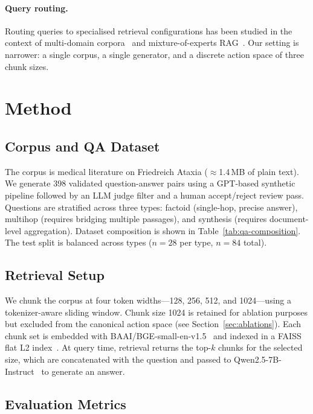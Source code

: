 \documentclass{article}
\begin{document}
\paragraph{Query routing.}
Routing queries to specialised retrieval configurations has been studied in
the context of multi-domain corpora~\cite{asai2023selfrag} and
mixture-of-experts RAG~\cite{shi2024large}. Our setting is narrower: a
single corpus, a single generator, and a discrete action space of three
chunk sizes.

\section{Method}

\subsection{Corpus and QA Dataset}

The corpus is medical literature on Friedreich Ataxia ($\approx$1.4\,MB of
plain text). We generate 398 validated question-answer pairs using a
GPT-based synthetic pipeline followed by an LLM judge filter and a human
accept/reject review pass. Questions are stratified across three types:
factoid (single-hop, precise answer), multihop (requires bridging multiple
passages), and synthesis (requires document-level aggregation). Dataset
composition is shown in Table~\ref{tab:qa-composition}. The test split is
balanced across types ($n=28$ per type, $n=84$ total).



\subsection{Retrieval Setup}

We chunk the corpus at four token widths---128, 256, 512, and 1024---using
a tokenizer-aware sliding window. Chunk size 1024 is retained for ablation
purposes but excluded from the canonical action space (see
Section~\ref{sec:ablations}). Each chunk set is embedded with
BAAI/BGE-small-en-v1.5~\cite{bge2023} and indexed in a FAISS flat
L2 index~\cite{johnson2019faiss}. At query time, retrieval returns the
top-$k$ chunks for the selected size, which are concatenated with the
question and passed to Qwen2.5-7B-Instruct~\cite{qwen2025} to generate
an answer.

\subsection{Evaluation Metrics}
\end{document}
